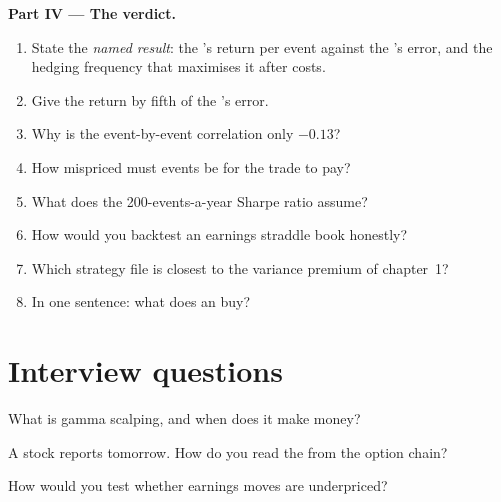\begin{problem}
\medskip\noindent\textbf{Part IV --- The verdict.}
\begin{enumerate}[resume]
\item State the \emph{named result}: the 's return per event against the 's error, and the hedging frequency that
maximises it after costs.
\item Give the return by fifth of the 's error.
\item Why is the event-by-event correlation only $-0.13$?
\item How mispriced must events be for the trade to pay?
\item What does the 200-events-a-year Sharpe ratio assume?
\item How would you backtest an earnings straddle book honestly?
\item Which strategy file is closest to the variance premium of chapter~1?
\item In one sentence: what does an  buy?
\end{enumerate}
\end{problem}

\section{Interview questions}

\begin{interviewq}\label{iq:s2:gamma-scalping-and-event-volatility:1}
What is gamma scalping, and when does it make money?
\end{interviewq}

\begin{interviewq}\label{iq:s2:gamma-scalping-and-event-volatility:2}
A stock reports tomorrow. How do you read the  from the option chain?
\end{interviewq}

\begin{interviewq}\label{iq:s2:gamma-scalping-and-event-volatility:3}
How would you test whether earnings moves are underpriced?
\end{interviewq}

